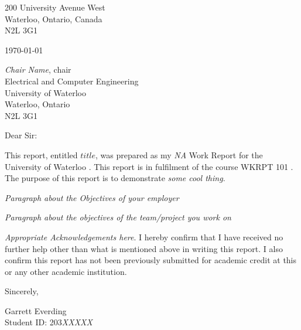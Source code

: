 \singlespacing

200 University Avenue West \\
Waterloo, Ontario, Canada \\
N2L 3G1 

\today 

\emph{Chair Name}, chair \\
Electrical and Computer Engineering \\
University of Waterloo \\
Waterloo, Ontario \\
N2L 3G1  

Dear Sir:  

This report, entitled \emph{$title$}, was prepared as my \emph{NA} Work Report for the University of Waterloo . This report is in fulfilment of the course WKRPT 101 . The purpose of this report is to demonstrate \emph{some cool thing}.  

\emph{Paragraph about the Objectives of your employer}

\emph{Paragraph about the objectives of the team/project you work on}

\emph{Appropriate Acknowledgements here}.  I hereby confirm that I have received no further help other than what is mentioned above in writing this report. I also confirm this report has not been previously submitted for academic credit at this or any other academic institution.

\vspace*{0.25in}

Sincerely,

\vspace*{0.75in}

Garrett Everding \\
Student ID: 203\emph{XXXXX}


\onehalfspacing
\clearpage


